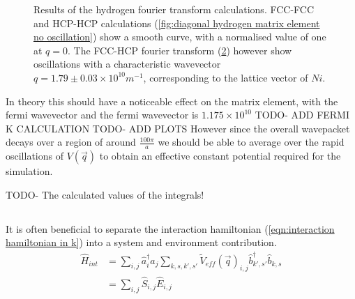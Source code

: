 \begin{figure}
\begin{subfigure}{0.45\linewidth}
    \label{fig:cross hydrogen matrix element oscillation}
  \end{subfigure}
  \caption{Results of the hydrogen fourier transform calculations.
  FCC-FCC and HCP-HCP calculations
  (\cref{fig:diagonal hydrogen matrix element no oscillation})
  show a smooth curve, with a normalised
  value of one at \(q=0\).
  The FCC-HCP fourier transform
  (\cref{fig:cross hydrogen matrix element oscillation})
  however show oscillations with a characteristic
  wavevector \(q = 1.79 \pm 0.03 \times{}10^{10}m^{-1}\),
  corresponding to the lattice vector of \(Ni\).}
\end{figure}

In theory this should have a noticeable
effect on the matrix element, with the
fermi wavevector
and the fermi wavevector is \(1.175\times{}10^{10}\) TODO- ADD FERMI K CALCULATION
TODO- ADD PLOTS
However since the overall wavepacket decays over a region
of around \(\frac{100\pi}{a}\) we should be
able to average over the rapid oscillations of
\(V(\vec{q})\) to obtain an effective constant
potential required for the simulation.

TODO- The calculated values of the integrals!

\subsection{}
It is often beneficial to separate the interaction
hamiltonian (\cref{eqn:interaction hamiltonian in k})
into a system and environment contribution.
\begin{align}
  \hat{H}_{int} & =
  \sum_{i,j}
  \hat{a}^\dagger_{i}\hat{a}_{j}
  \sum_{k,s,k',s'}
  {\tilde{V}_{eff}(\vec{q})}_{i,j}
  \hat{b}^\dagger_{k',s'}\hat{b}_{k,s}                                                              \\
                & = \sum_{i,j} \hat{S}_{i,j} \hat{E}_{i,j}\label{eqn:split interaction hamiltonian}
\end{align}
